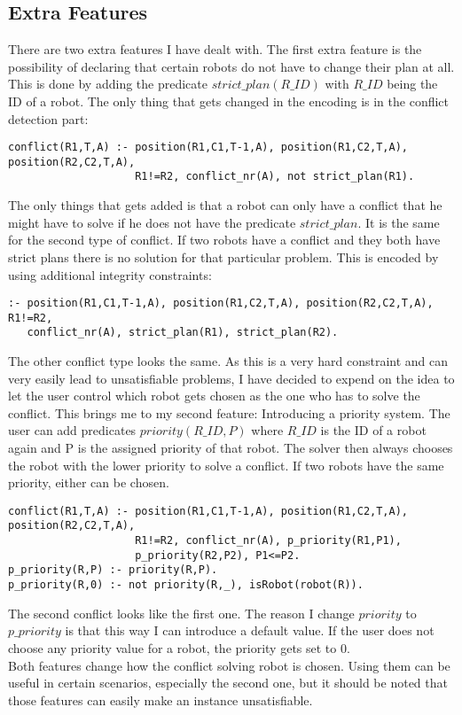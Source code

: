 \documentclass[runningheads]{llncs}
\begin{document}
\subsection{Extra Features}
There are two extra features I have dealt with. The first extra feature is the possibility of declaring that certain robots do not have to change their plan at all.
This is done by adding the predicate $strict\_plan(R\_ID)$ with $R\_ID$ being the ID of a robot. The only thing that gets changed in the encoding is in the conflict detection part:
\begin{verbatim}
conflict(R1,T,A) :- position(R1,C1,T-1,A), position(R1,C2,T,A), position(R2,C2,T,A), 
                    R1!=R2, conflict_nr(A), not strict_plan(R1).
\end{verbatim}
The only things that gets added is that a robot can only have a conflict that he might have to solve if he does not have the predicate $strict\_plan$. It is
the same for the second type of conflict. If two robots have a conflict and they both have strict plans there is no solution for that particular problem. 
This is encoded by using additional integrity constraints:
\begin{verbatim}
:- position(R1,C1,T-1,A), position(R1,C2,T,A), position(R2,C2,T,A), R1!=R2, 
   conflict_nr(A), strict_plan(R1), strict_plan(R2).
\end{verbatim}
The other conflict type looks the same. As this is a very hard constraint and can very easily lead to unsatisfiable problems, I have decided to expend on the idea
to let the user control which robot gets chosen as the one who has to solve the conflict. This brings me to my second feature: Introducing a priority system.
The user can add predicates $priority(R\_ID, P)$ where $R\_ID$ is the ID of a robot again and P is the assigned priority of that robot. 
The solver then always chooses the robot with the lower priority to solve a conflict. If two robots have the same priority, either can be chosen. 
\begin{verbatim}
conflict(R1,T,A) :- position(R1,C1,T-1,A), position(R1,C2,T,A), position(R2,C2,T,A), 
                    R1!=R2, conflict_nr(A), p_priority(R1,P1), 
                    p_priority(R2,P2), P1<=P2.
p_priority(R,P) :- priority(R,P).
p_priority(R,0) :- not priority(R,_), isRobot(robot(R)).						
\end{verbatim}
The second conflict looks like the first one. The reason I change $priority$ to $p\_priority$ is that this way I can introduce a default value. If the user does not choose any priority value for a robot,
the priority gets set to 0. \\
Both features change how the conflict solving robot is chosen. Using them can be useful in certain scenarios, especially the second one, but it should be noted that those features can
easily make an instance unsatisfiable.
\end{document}
